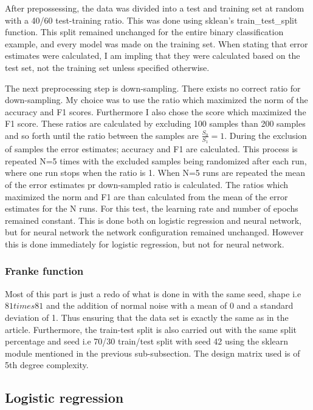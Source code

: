 \documentclass[uio,jmp,amsmath,amssymb,reprint,nofootinbib]{revtex4-1}
\numberwithin{equation}{section}
\begin{document}
After prepossessing, the data was divided into a test and training set at random with a 40/60 test-training ratio. This was done using sklean's train\_test\_split function. This split remained unchanged for the entire binary classification example, and every model was made on the training set. When stating that error estimates were calculated, I am impling that they were calculated based on the test set, not the training set unless specified otherwise.

The next preprocessing step is down-sampling. There exists no correct ratio for down-sampling. My choice was to use the ratio which maximized the norm of the accuracy and F1 scores. Furthermore I also chose the score which maximized the F1 score. These ratios are calculated by excluding 100 samples than 200 samples and so forth until the ratio between the samples are \(\frac{S_0}{S_1} = 1\). During the exclusion of samples the error estimates; accuracy and F1 are calculated. This process is repeated N=5 times with the excluded samples being randomized after each run, where one run stops when the ratio is 1. When N=5 runs are repeated the mean of the error estimates pr down-sampled ratio is calculated. The ratios which maximized the norm and F1 are than calculated from the mean of the error estimates for the N runs. For this test, the learning rate and number of epochs remained constant. This is done both on logistic regression and neural network, but for neural network the network configuration remained unchanged. However this is done immediately for logistic regression, but not for neural network.

\subsubsection{Franke function}

Most of this part is just a redo of what is done in \cite{Jon_P1} with the same seed, shape i.e \(81times 81\) and the addition of normal noise with a mean of 0 and a standard deviation of 1. Thus ensuring that the data set is exactly the same as in the article. Furthermore, the train-test split is also carried out with the same split percentage and seed i.e 70/30 train/test split with seed 42 using the sklearn module mentioned in the previous sub-subsection. The design matrix used is of 5th degree complexity.

\subsection{Logistic regression}
\end{document}
